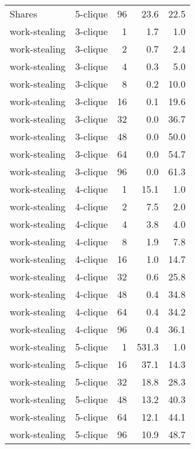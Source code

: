 \begin{tabular}{llr|rr}
        Shares &  5-clique &           96 &   23.6 &     22.5 \\
 work-stealing &  3-clique &            1 &    1.7 &      1.0 \\
 work-stealing &  3-clique &            2 &    0.7 &      2.4 \\
 work-stealing &  3-clique &            4 &    0.3 &      5.0 \\
 work-stealing &  3-clique &            8 &    0.2 &     10.0 \\
 work-stealing &  3-clique &           16 &    0.1 &     19.6 \\
 work-stealing &  3-clique &           32 &    0.0 &     36.7 \\
 work-stealing &  3-clique &           48 &    0.0 &     50.0 \\
 work-stealing &  3-clique &           64 &    0.0 &     54.7 \\
 work-stealing &  3-clique &           96 &    0.0 &     61.3 \\
 work-stealing &  4-clique &            1 &   15.1 &      1.0 \\
 work-stealing &  4-clique &            2 &    7.5 &      2.0 \\
 work-stealing &  4-clique &            4 &    3.8 &      4.0 \\
 work-stealing &  4-clique &            8 &    1.9 &      7.8 \\
 work-stealing &  4-clique &           16 &    1.0 &     14.7 \\
 work-stealing &  4-clique &           32 &    0.6 &     25.8 \\
 work-stealing &  4-clique &           48 &    0.4 &     34.8 \\
 work-stealing &  4-clique &           64 &    0.4 &     34.2 \\
 work-stealing &  4-clique &           96 &    0.4 &     36.1 \\
 work-stealing &  5-clique &            1 &  531.3 &      1.0 \\
 work-stealing &  5-clique &           16 &   37.1 &     14.3 \\
 work-stealing &  5-clique &           32 &   18.8 &     28.3 \\
 work-stealing &  5-clique &           48 &   13.2 &     40.3 \\
 work-stealing &  5-clique &           64 &   12.1 &     44.1 \\
 work-stealing &  5-clique &           96 &   10.9 &     48.7 \\
\bottomrule
\end{tabular}
